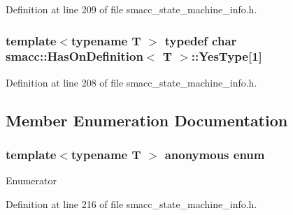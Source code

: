 Definition at line 209 of file smacc\+\_\+state\+\_\+machine\+\_\+info.\+h.

\subsubsection[{\texorpdfstring{Yes\+Type}{YesType}}]{\setlength{\rightskip}{0pt plus 5cm}template$<$typename T $>$ typedef char {\bf smacc\+::\+Has\+On\+Definition}$<$ T $>$\+::Yes\+Type\mbox{[}1\mbox{]}\hspace{0.3cm}{\ttfamily [private]}}\hypertarget{classsmacc_1_1HasOnDefinition_af147416543b9d5a19d3dfc4f3f0d42a6}{}\label{classsmacc_1_1HasOnDefinition_af147416543b9d5a19d3dfc4f3f0d42a6}


Definition at line 208 of file smacc\+\_\+state\+\_\+machine\+\_\+info.\+h.



\subsection{Member Enumeration Documentation}
\subsubsection[{\texorpdfstring{anonymous enum}{anonymous enum}}]{\setlength{\rightskip}{0pt plus 5cm}template$<$typename T $>$ anonymous enum}\hypertarget{classsmacc_1_1HasOnDefinition_a5bbbdf43322ac6428797ff51c8a78f3a}{}\label{classsmacc_1_1HasOnDefinition_a5bbbdf43322ac6428797ff51c8a78f3a}
\begin{Desc}
\item[Enumerator]\par
\begin{description}
\item[{\em 
value\hypertarget{classsmacc_1_1HasOnDefinition_a5bbbdf43322ac6428797ff51c8a78f3aa0ee3bd0e07973c128ab64f02600c7720}{}\label{classsmacc_1_1HasOnDefinition_a5bbbdf43322ac6428797ff51c8a78f3aa0ee3bd0e07973c128ab64f02600c7720}
}]\end{description}
\end{Desc}


Definition at line 216 of file smacc\+\_\+state\+\_\+machine\+\_\+info.\+h.


